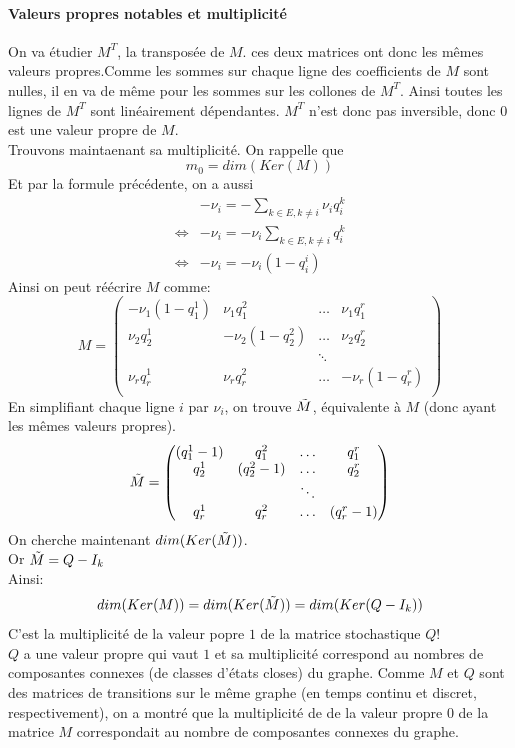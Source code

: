 \documentclass[a4paper]{article}
\theoremstyle{plain}
\theoremstyle{definition}
\theoremstyle{remark}
\begin{document}
 \paragraph{Valeurs propres notables et multiplicité}
 On va étudier $M^T$, la transposée de $M$. ces deux matrices ont donc les mêmes valeurs propres.Comme les sommes sur chaque ligne des coefficients de $M$ sont nulles, il en va de même pour les sommes sur les collones de $M^T$. Ainsi toutes les lignes de $M^T$ sont linéairement dépendantes. $M^T$ n'est donc pas inversible, donc $0$ est une valeur propre de $M$.\\
 Trouvons maintaenant sa multiplicité. On rappelle que 
 $$m_{0}=dim(Ker(M))$$
 Et par la formule précédente, on a aussi
 \begin{align*}
   &-\nu_i=-\sum_{k\in E,k\neq i}\nu_iq_i^k\\
   \Longleftrightarrow &-\nu_i=-\nu_i\sum_{k\in E,k\neq i}q_i^k\\
    \Longleftrightarrow &-\nu_i=-\nu_i(1-q_i^i)
\end{align*}
Ainsi on peut réécrire $M$ comme:
$$M=
\begin{pmatrix}
-\nu_1(1-q_1^1) & \nu_1q_1^2&\hdots&\nu_1q_1^r\\
\nu_2q_2^1& -\nu_2(1-q_2^2)&\hdots&\nu_2q_2^r\\
&&\ddots\\
\nu_rq_r^1&\nu_rq_r^2&\hdots&-\nu_r(1-q_r^r)\\
\end{pmatrix}
$$
En simplifiant chaque ligne $i$ par $\nu_i$, on trouve $\Tilde{M}$, équivalente à $M$ (donc ayant les mêmes valeurs propres).
$$\Tilde{M}=
\begin{pmatrix}
(q_1^1-1) &q_1^2&\hdots&q_1^r\\
q_2^1& (q_2^2-1)&\hdots&q_2^r\\
&&\ddots\\
q_r^1&q_r^2&\hdots&(q_r^r-1)\\
\end{pmatrix}
$$
On cherche maintenant $dim(Ker(\Tilde{M}))$.\\
Or $\Tilde{M}=Q-I_k$ \\
Ainsi:
$$dim(Ker(M))=dim(Ker(\Tilde{M}))=dim(Ker(Q-I_k))$$
C'est la multiplicité de la valeur popre $1$ de la matrice stochastique $Q$! \\
$Q$ a une valeur propre qui vaut $1$ et sa multiplicité correspond au nombres de composantes connexes (de classes d'états closes) du graphe. Comme $M$ et $Q$ sont des matrices de transitions sur le même graphe (en temps continu et discret, respectivement), on a montré que la multiplicité de de la valeur propre $0$ de la matrice $M$ correspondait au nombre de composantes connexes du graphe.\\
\end{document}

